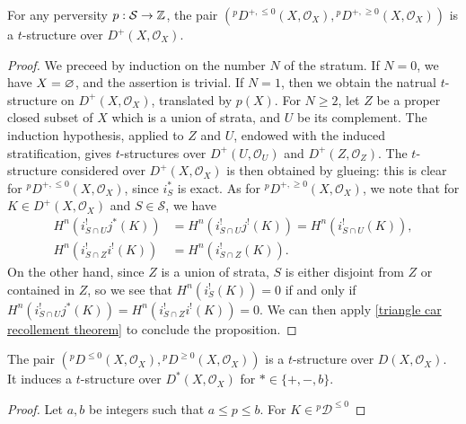 \begin{proposition}\label{triangle cat perverse t-structure}
For any perversity $p:\mathcal{S}\to\mathbb{Z}$, the pair $({^pD^{+,\leq 0}}(X,\mathscr{O}_X),{^pD^{+,\geq 0}}(X,\mathscr{O}_X))$ is a $t$-structure over $D^+(X,\mathscr{O}_X)$.
\end{proposition}
\begin{proof}
We preceed by induction on the number $N$ of the stratum. If $N=0$, we have $X=\varnothing$, and the assertion is trivial. If $N=1$, then we obtain the natrual $t$-structure on $D^+(X,\mathscr{O}_X)$, translated by $p(X)$. For $N\geq 2$, let $Z$ be a proper closed subset of $X$ which is a union of strata, and $U$ be its complement. The induction hypothesis, applied to $Z$ and $U$, endowed with the induced stratification, gives $t$-structures over $D^+(U,\mathscr{O}_U)$ and $D^+(Z,\mathscr{O}_Z)$. The $t$-structure considered over $D^+(X,\mathscr{O}_X)$ is then obtained by glueing: this is clear for ${^pD^{+,\leq 0}}(X,\mathscr{O}_X)$, since $i_S^*$ is exact. As for ${^pD^{+,\geq 0}}(X,\mathscr{O}_X)$, we note that for $K\in D^+(X,\mathscr{O}_X)$ and $S\in\mathcal{S}$, we have
\begin{align*}
H^n(i_{S\cap U}^!j^*(K))&=H^n(i_{S\cap U}^!j^!(K))=H^n(i_{S\cap U}^!(K)),\\
H^n(i_{S\cap Z}^!i^!(K))&=H^n(i_{S\cap Z}^!(K)).
\end{align*}
On the other hand, since $Z$ is a union of strata, $S$ is either disjoint from $Z$ or contained in $Z$, so we see that $H^n(i_S^!(K))=0$ if and only if $H^n(i_{S\cap U}^!j^*(K))=H^n(i_{S\cap Z}^!i^!(K))=0$. We can then apply \cref{triangle car recollement theorem} to conclude the proposition.
\end{proof}

\begin{corollary}
The pair $({^pD^{\leq 0}}(X,\mathscr{O}_X),{^pD^{\geq 0}}(X,\mathscr{O}_X))$ is a $t$-structure over $D(X,\mathscr{O}_X)$. It induces a $t$-structure over $D^*(X,\mathscr{O}_X)$ for $*\in\{+,-,b\}$.
\end{corollary}
\begin{proof}
Let $a,b$ be integers such that $a\leq p\leq b$. For $K\in {^p\mathcal{D}^{\leq 0}}$
\end{proof}